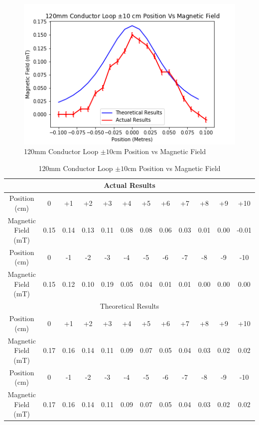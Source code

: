 \documentclass[12pt]{article}
\begin{document}
\begin{figure}[H]
\centering
\includegraphics[scale=0.7]{Images/Conductors/120mm_CL_Position(cm)_Vs_Magnetic_Field_Graph.png}
\caption{120mm Conductor Loop $\pm10$cm Position vs Magnetic Field}
\label{120mm CL Positon Vs Magnetic Field Graph}
\end{figure}

\begin{table}[H]
\begin{center}
 \footnotesize
 \begin{tabular}{|c||c|c|c|c|c|c|c|c|c|c|c|}
 \hline
 \multicolumn{12}{|c|}{Actual Results} \\
 \hline
 Position (cm) & 0 & +1 & +2 & +3 & +4 & +5 & +6 & +7 & +8 & +9 & +10 \\
 \hline
 Magnetic Field (mT) & 0.15 & 0.14 & 0.13 & 0.11 & 0.08 & 0.08 & 0.06 & 0.03 & 0.01 & 0.00 & -0.01 \\
 \hline \hline
 Position (cm) & 0 & -1 & -2 & -3 & -4 & -5 & -6 & -7 & -8 & -9 & -10 \\
 \hline
 Magnetic Field (mT) & 0.15 & 0.12 & 0.10 & 0.19 & 0.05 & 0.04 & 0.01 & 0.01 & 0.00 & 0.00 & 0.00 \\
 \hline
 \hline
 \multicolumn{12}{|c|}{Theoretical Results} \\
 \hline
 Position (cm) & 0 & +1 & +2 & +3 & +4 & +5 & +6 & +7 & +8 & +9 & +10 \\
 \hline
 Magnetic Field (mT) & 0.17 & 0.16 & 0.14 & 0.11 & 0.09 & 0.07 & 0.05 & 0.04 & 0.03 & 0.02 & 0.02 \\
 \hline \hline
 Position (cm) & 0 & -1 & -2 & -3 & -4 & -5 & -6 & -7 & -8 & -9 & -10 \\
 \hline
 Magnetic Field (mT) & 0.17 & 0.16 & 0.14 & 0.11 & 0.09 & 0.07 & 0.05 & 0.04 & 0.03 & 0.02 & 0.02 \\
 \hline
 \end{tabular}
 \caption{120mm Conductor Loop $\pm10$cm Position vs Magnetic Field}
 \label{120mm CL Postion Vs Magnetic Field Table}
\end{center}
\end{table}
\end{document}
